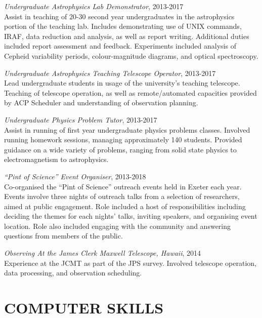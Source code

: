 \documentclass[letter, margin, 10pt]{res} %
\begin{document}
\begin{resume}
{\sl Undergraduate Astrophysics Lab Demonstrator}, 2013-2017\\
Assist in teaching of 20-30 second year undergraduates in the astrophysics portion of the teaching lab. Includes demonstrating use of UNIX commands, IRAF, data reduction and analysis, as well as report writing. Additional duties included report assessment and feedback. Experiments included analysis of Cepheid variability periods, colour-magnitude diagrams, and optical spectroscopy.

{\sl Undergraduate Astrophysics Teaching Telescope Operator}, 2013-2017\\
Lead undergraduate students in usage of the university's teaching telescope. Teaching of telescope operation, as well as remote/automated capacities provided by ACP Scheduler and understanding of observation planning.

{\sl Undergraduate Physics Problem Tutor}, 2013-2017\\
Assist in running of first year undergraduate physics problems classes. Involved running homework sessions, managing approximately 140 students. Provided guidance on a wide variety of problems, ranging from solid state physics to electromagnetism to astrophysics. 

{\sl ``Pint of Science'' Event Organiser}, 2013-2018\\
Co-organised the ``Pint of Science'' outreach events held in Exeter each year. Events involve three nights of outreach talks from a selection of researchers, aimed at public engagement. Role included a host of responsibilities including deciding the themes for each nights' talks, inviting speakers, and organising event location. Role also included engaging with the community and answering questions from members of the public.

{\sl Observing At the James Clerk Maxwell Telescope, Hawaii}, 2014\\
Experience at the JCMT as part of the JPS survey. Involved telescope operation, data processing, and observation scheduling.


 
\vspace{-5pt}
\section{COMPUTER SKILLS}


\end{resume}
\end{document}
